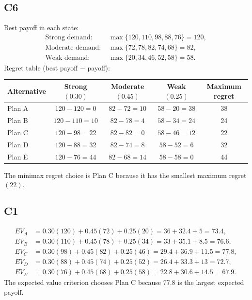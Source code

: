 \begin{ExamProblems}
		\subsection*{C6}
		Best payoff in each state:
		\[
		\begin{aligned}
			\text{Strong demand: } &\max\{120, 110, 98, 88, 76\} = 120, \\
			\text{Moderate demand: } &\max\{72, 78, 82, 74, 68\} = 82, \\
			\text{Weak demand: } &\max\{20, 34, 46, 52, 58\} = 58.
		\end{aligned}
		\]
		Regret table (best payoff $-$ payoff):
		\begin{center}
			\begin{tabular}{l c c c c}
				\toprule
				Alternative & Strong $(0.30)$ & Moderate $(0.45)$ & Weak $(0.25)$ & Maximum regret \\
				\midrule
				Plan A & $120-120=0$ & $82-72=10$ & $58-20=38$ & 38 \\
				Plan B & $120-110=10$ & $82-78=4$ & $58-34=24$ & 24 \\
				Plan C & $120-98=22$ & $82-82=0$ & $58-46=12$ & 22 \\
				Plan D & $120-88=32$ & $82-74=8$ & $58-52=6$ & 32 \\
				Plan E & $120-76=44$ & $82-68=14$ & $58-58=0$ & 44 \\
				\bottomrule
			\end{tabular}
		\end{center}
		The minimax regret choice is Plan C because it has the smallest maximum regret $(22)$.
		
		\subsection*{C1}
		\[
		\begin{aligned}
		EV_A &= 0.30(120)+0.45(72)+0.25(20)=36+32.4+5=73.4,\\
		EV_B &= 0.30(110)+0.45(78)+0.25(34)=33+35.1+8.5=76.6,\\
		EV_C &= 0.30(98)+0.45(82)+0.25(46)=29.4+36.9+11.5=77.8,\\
		EV_D &= 0.30(88)+0.45(74)+0.25(52)=26.4+33.3+13=72.7,\\
		EV_E &= 0.30(76)+0.45(68)+0.25(58)=22.8+30.6+14.5=67.9.
		\end{aligned}
		\]
		The expected value criterion chooses Plan C because $77.8$ is the largest expected payoff.
		
		\item

\end{ExamProblems}
